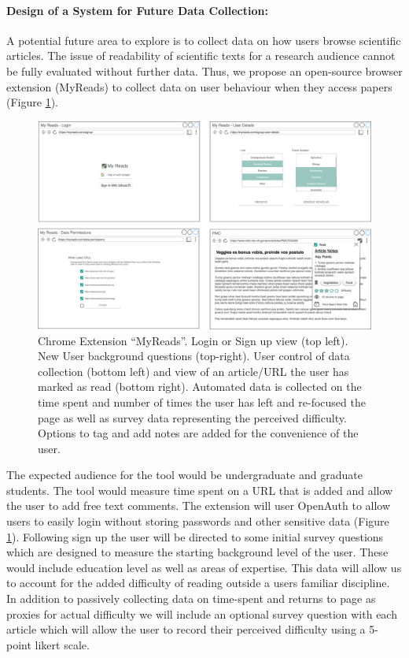 \documentclass[11pt,a4paper]{article}
\begin{document}
\paragraph{Design of a System for Future Data Collection:}
A potential future area to explore is to collect data on how users browse scientific articles. The issue of readability of scientific texts for a research audience cannot be fully evaluated without further data. Thus, we propose an open-source browser extension (MyReads) to collect data on user behaviour when they access papers (Figure \ref{fig:chrome-ext}). 

\begin{figure}
    \centering
    \includegraphics[width=15.5cm]{images/CPSC503-mockup-4-panel.png}
    \caption{Chrome Extension “MyReads”. Login or Sign up view (top left). New User background questions (top-right). User control of data collection (bottom left) and view of an article/URL the user has marked as read (bottom right). Automated data is collected on the time spent and number of times the user has left and re-focused the page as well as survey data representing the perceived difficulty. Options to tag and add notes are added for the convenience of the user.}
    \label{fig:chrome-ext}
\end{figure}

The expected audience for the tool would be undergraduate and graduate students. The tool would measure time spent on a URL that is added and allow the user to add free text comments. The extension will user OpenAuth to allow users to easily login without storing passwords and other sensitive data (Figure \ref{fig:chrome-ext}). Following sign up the user will be directed to some initial survey questions which are designed to measure the starting background level of the user. These would include education level as well as areas of expertise. This data will allow us to account for the added difficulty of reading outside a users familiar discipline. In addition to passively collecting data on time-spent and returns to page as proxies for actual difficulty we will include an optional survey question with each article which will allow the user to record their perceived difficulty using a 5-point likert scale.
\end{document}
